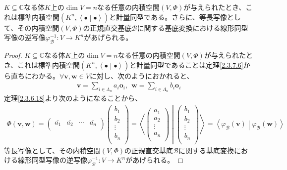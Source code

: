 \documentclass[dvipdfmx]{jsarticle}
\begin{document}
\begin{thm}\label{2.3.7.7}
$K \subseteq \mathbb{C}$なる体$K$上の$\dim V = n$なる任意の内積空間$(V,\varPhi )$が与えられたとき、これは標準内積空間$\left( K^{n},\left\langle \bullet \middle| \bullet \right\rangle \right)$と計量同型である。さらに、等長写像として、その内積空間$(V,\varPhi )$の正規直交基底$\mathcal{B}$に関する基底変換における線形同型写像の逆写像$\varphi_{\mathcal{B}}^{- 1}:V \rightarrow K^{n}$があげられる。
\end{thm}
\begin{proof}
$K \subseteq \mathbb{C}$なる体$K$上の$\dim V = n$なる任意の内積空間$(V,\varPhi )$が与えられたとき、これは標準内積空間$\left( K^{n},\left\langle \bullet \middle| \bullet \right\rangle \right)$と計量同型であることは定理\ref{2.3.7.6}から直ちにわかる。$\forall\mathbf{v},\mathbf{w} \in V$に対し、次のようにおかれると、
\begin{align*}
\mathbf{v} = \sum_{i \in \varLambda_{n}} {a_{i}\mathbf{o}_{i}},\ \ \mathbf{w} = \sum_{i \in \varLambda_{n}} {b_{i}\mathbf{o}_{i}}
\end{align*}
定理\ref{2.3.6.18}より次のようになることから、
\begin{align*}
\varPhi \left( \mathbf{v},\mathbf{w} \right) = \begin{pmatrix}
\overline{a_{1}} & \overline{a_{2}} & \cdots & \overline{a_{n}} \\
\end{pmatrix}\begin{pmatrix}
b_{1} \\
b_{2} \\
 \vdots \\
b_{n} \\
\end{pmatrix} = \left\langle \begin{pmatrix}
a_{1} \\
a_{2} \\
 \vdots \\
a_{n} \\
\end{pmatrix} \middle| \begin{pmatrix}
b_{1} \\
b_{2} \\
 \vdots \\
b_{n} \\
\end{pmatrix} \right\rangle = \left\langle \varphi_{\mathcal{B}}\left( \mathbf{v} \right) \middle| \varphi_{\mathcal{B}}\left( \mathbf{w} \right) \right\rangle
\end{align*}
等長写像として、その内積空間$(V,\varPhi )$の正規直交基底$\mathcal{B}$に関する基底変換における線形同型写像の逆写像$\varphi_{\mathcal{B}}^{- 1}:V \rightarrow K^{n}$があげられる。
\end{proof}
\end{document}
